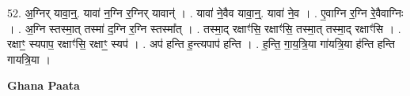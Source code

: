 \documentclass[17pt]{extarticle}
\begin{document}
52. अ॒ग्निर् यावा॒न्॒. यावा॑ न॒ग्नि र॒ग्निर् यावान्॑ । . यावा॑ ने॒वैव यावा॒न्॒. यावा॑ ने॒व । . ए॒वाग्नि र॒ग्नि रे॒वैवाग्निः । . अ॒ग्नि स्तस्मा॒त् तस्मा॑ द॒ग्नि र॒ग्नि स्तस्मा᳚त् । . तस्मा॒द् रक्षाꣳ॑सि॒ रक्षाꣳ॑सि॒ तस्मा॒त् तस्मा॒द् रक्षाꣳ॑सि । . रक्षाꣳ॒॒ स्यपाप॒ रक्षाꣳ॑सि॒ रक्षाꣳ॒॒ स्यप॑ । . अप॑ हन्ति ह॒न्त्यपाप॑ हन्ति । . ह॒न्ति॒ गा॒य॒त्रि॒या गा॑यत्रि॒या ह॑न्ति हन्ति गायत्रि॒या । \newline

\textbf{Ghana Paata } \newline
\end{document}
